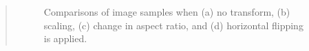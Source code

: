\documentclass[9pt]{article}
\begin{document}
\begin{quote}
\begin{figure}[h]
    \centering
    \caption{Comparisons of image samples when (a) no transform, (b) scaling, (c) change in aspect ratio, and (d) horizontal flipping is applied.}
    \label{fig:transform}
\end{figure}


\end{quote}
\end{document}
